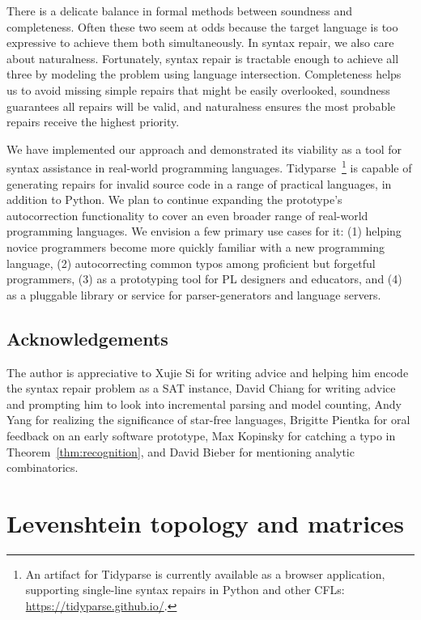 \documentclass[sigplan,acmsmall,nonacm,screen]{acmart}\settopmatter{printfolios=false,printccs=false,printacmref=false}
\begin{document}
There is a delicate balance in formal methods between soundness and completeness. Often these two seem at odds because the target language is too expressive to achieve them both simultaneously. In syntax repair, we also care about naturalness. Fortunately, syntax repair is tractable enough to achieve all three by modeling the problem using language intersection. Completeness helps us to avoid missing simple repairs that might be easily overlooked, soundness guarantees all repairs will be valid, and naturalness ensures the most probable repairs receive the highest priority.

We have implemented our approach and demonstrated its viability as a tool for syntax assistance in real-world programming languages. Tidyparse~\footnote{An artifact for Tidyparse is currently available as a browser application, supporting single-line syntax repairs in Python and other CFLs: \url{https://tidyparse.github.io/}.} is capable of generating repairs for invalid source code in a range of practical languages, in addition to Python. We plan to continue expanding the prototype's autocorrection functionality to cover an even broader range of real-world programming languages. We envision a few primary use cases for it: (1) helping novice programmers become more quickly familiar with a new programming language, (2) autocorrecting common typos among proficient but forgetful programmers, (3) as a prototyping tool for PL designers and educators, and (4) as a pluggable library or service for parser-generators and language servers.

\subsection{Acknowledgements}

The author is appreciative to Xujie Si for writing advice and helping him encode the syntax repair problem as a SAT instance, David Chiang for writing advice and prompting him to look into incremental parsing and model counting, Andy Yang for realizing the significance of star-free languages, Brigitte Pientka for oral feedback on an early software prototype, Max Kopinsky for catching a typo in Theorem~\ref{thm:recognition}, and David Bieber for mentioning analytic combinatorics.

\clearpage\vspace{-1cm}

\pagebreak\appendix

\section{Levenshtein topology and matrices}
\end{document}
